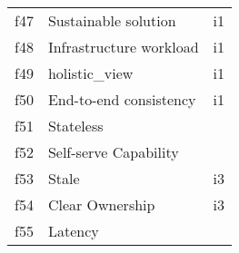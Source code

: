 \begin{tabular}{|c|p{}|p{}|}
f47 & Sustainable solution & \cellcolor{emerald_shape_1} {i1}\\
f48 & Infrastructure workload & \cellcolor{emerald_shape_1} {i1}\\
f49 & holistic_view & \cellcolor{emerald_shape_1} {i1}\\
f50 & End-to-end consistency & \cellcolor{emerald_shape_1} {i1}\\
f51 & Stateless & \cellcolor{emerald_shape_1} {}\\
f52 & Self-serve Capability & \cellcolor{emerald_shape_1} {}\\
f53 & Stale & \cellcolor{emerald_shape_1} {i3}\\
f54 & Clear Ownership & \cellcolor{emerald_shape_1} {i3}\\
f55 & Latency & \cellcolor{emerald_shape_1} {}\\
\hline
\end{tabular}
